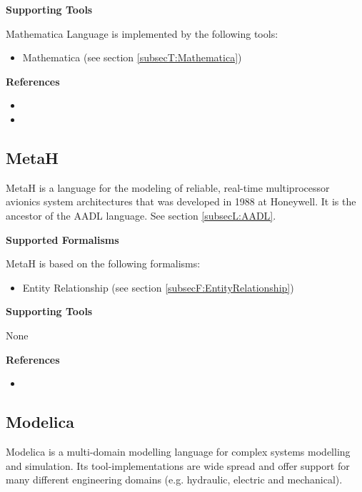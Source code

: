 \textbf{Supporting Tools}

Mathematica Language is implemented by the following tools:
\begin{itemize}
	\item Mathematica (see section \ref{subsecT:Mathematica})
\end{itemize}


\textbf{References}
\begin{itemize}
	
\item {}
	
\item {}
\end{itemize}



\subsection{MetaH}
\label{subsecL:MetaH}


MetaH is a language for the modeling of reliable, real-time multiprocessor avionics system architectures that was developed in 1988 at Honeywell. It is the ancestor of the AADL language. See section \ref{subsecL:AADL}.

\textbf{Supported Formalisms}

MetaH is based on the following formalisms:
\begin{itemize}
	\item Entity Relationship (see section \ref{subsecF:EntityRelationship})
\end{itemize}


\textbf{Supporting Tools}

None


\textbf{References}
\begin{itemize}
	
\item {}
\end{itemize}



\subsection{Modelica}
\label{subsecL:Modelica}


Modelica is a multi-domain modelling language for complex systems modelling and simulation. Its tool-implementations are wide spread and offer support for many different engineering domains (e.g. hydraulic, electric and mechanical).


